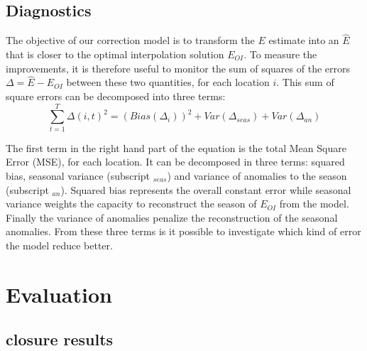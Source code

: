 \documentclass[draft]{agujournal2019}
\begin{document}
\subsection{Diagnostics}
The objective of our correction model is to transform the $E$ estimate into an $\hat E$ that is closer to the optimal interpolation solution $E_{OI}$. To measure the improvements, it is therefore useful to monitor the sum of squares of the errors $\Delta = \hat E - E_{OI}$ between these two quantities, for each location $i$.
This sum of square errors can be decomposed into three terms:
\begin{equation}
\sum_{t=1}^T {\Delta(i,t)}^2 =   \left(Bias\left(\Delta_i  \right) \right)^2 + Var\left( \Delta_{seas} \right) + Var\left( \Delta_{an} \right)
\end{equation}

The first term in the right hand part of the equation is the total Mean Square Error (MSE), for each location. It can be decomposed in three terms: squared bias, seasonal variance (subscript $_{seas}$) and variance of anomalies to the season (subscript $_{an}$). Squared bias represents the overall constant error while seasonal variance weights the capacity to reconstruct the season of $E_{OI}$ from the model. Finally the variance of anomalies penalize the reconstruction of the seasonal anomalies. From these three terms is it possible to investigate which kind of error the model reduce better.





\section{Evaluation}



\subsection{closure results}
\end{document}
